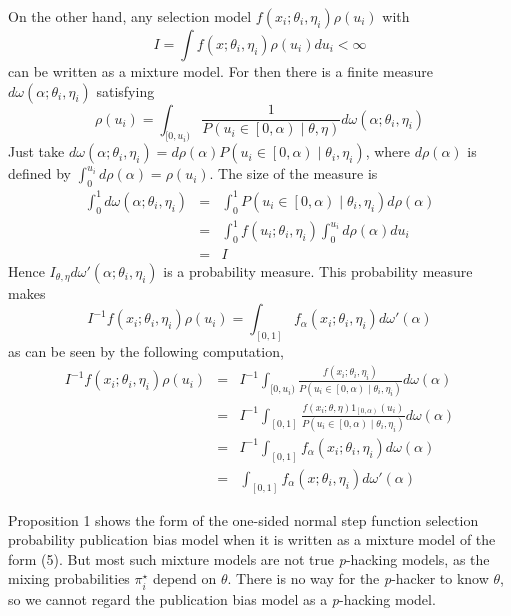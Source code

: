 On the other hand, any selection model $f(x_{i};\theta_{i},\eta_{i})\rho(u_i)$ with $$I =\int f(x;\theta_{i},\eta_{i})\rho(u_i)du_i<\infty$$ can be written as a mixture model. For then there is a finite measure $d\omega(\alpha;\theta_{i},\eta_{i})$ satisfying 
\[
\rho(u_i)=\int_{[0,u_i)}\frac{1}{P(u_i\in\left[0,\alpha\right)\mid\theta,\eta)}d\omega(\alpha;\theta_{i},\eta_{i})
\]
Just take $d\omega(\alpha;\theta_{i},\eta_{i})=d\rho(\alpha)P(u_i\in\left[0,\alpha\right)\mid\theta_{i},\eta_{i})$, where $d\rho(\alpha)$ is defined by $\int_{0}^{u_i}d\rho(\alpha)=\rho(u_i)$. The size of the measure is
\begin{eqnarray*}
\int_{0}^{1}d\omega(\alpha;\theta_{i},\eta_{i}) & = & \int_{0}^{1}P(u_i\in\left[0,\alpha\right)\mid\theta_{i},\eta_{i})d\rho(\alpha)\\
 & = & \int_{0}^{1}f(u_i;\theta_{i},\eta_{i})\int_{0}^{u_i}d\rho(\alpha)du_i\\
 & = & I
\end{eqnarray*}
Hence $I_{\theta,\eta}d\omega'(\alpha;\theta_{i},\eta_{i})$ is a probability measure. This probability measure makes 
\[
I^{-1}f(x_{i};\theta_{i},\eta_{i})\rho(u_i)=\int_{[0,1]}f_\alpha(x_{i};\theta_{i},\eta_{i})d\omega'(\alpha)
\]
as can be seen by the following computation,
\begin{eqnarray*}
I^{-1}f(x_{i};\theta_{i},\eta_{i})\rho(u_i) & = & I^{-1}\int_{[0,u_i)}\frac{f(x_{i};\theta_{i},\eta_{i})}{P(u_i\in\left[0,\alpha\right)\mid\theta_{i},\eta_{i})}d\omega(\alpha)\\
 & = & I^{-1}\int_{[0,1]}\frac{f(x_{i};\theta,\eta)1_{\left[0,\alpha\right)}(u_i)}{P(u_i\in\left[0,\alpha\right)\mid\theta_{i},\eta_{i})}d\omega(\alpha)\\
 & = & I^{-1}\int_{[0,1]}f_\alpha(x_{i};\theta_{i},\eta_{i})d\omega(\alpha)\\
 & = & \int_{[0,1]}f_\alpha(x;\theta_{i},\eta_{i})d\omega'(\alpha)
\end{eqnarray*}

Proposition 1 shows the form of the one-sided normal step function selection probability publication bias model when it is written as a mixture model of the form (5). But most such mixture models are not true \textit{p}-hacking models, as the mixing probabilities $\pi_{i}^{\star}$ depend on $\theta$. There is no way for the \textit{p}-hacker to know
$\theta$, so we cannot regard the publication bias model as a \textit{p}-hacking model.
